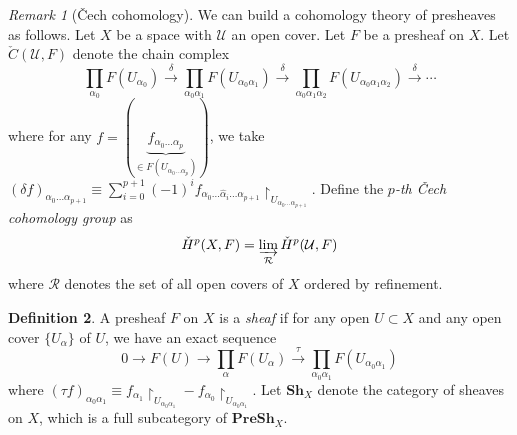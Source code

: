 \documentclass[10pt,letterpaper,cm]{nupset}
\theoremstyle{definition}
\newtheorem{definition}{Definition}[subsection]
\theoremstyle{theorem}
\theoremstyle{remark}
\newtheorem{remark}[definition]{Remark}
\newcommand{\1}{\mathbb{1}}
\newcommand{\0}{\vec 0}
\begin{document}
\begin{remark}[\v{C}ech cohomology]
We can build a cohomology theory of presheaves as follows. Let $X$ be a space with $\mathcal{U}$ an open cover. Let $F$ be a presheaf on $X$.  Let $\check{C}(\mathcal{U}, F)$ denote the chain complex
$$   \prod_{\alpha_0}F(U_{\alpha_0}) \overset{\delta}{\longrightarrow} \prod_{\alpha_0\alpha_1} F(U_{\alpha_0 \alpha_1}) \overset{\delta}{\longrightarrow} \prod_{\alpha_0\alpha_1\alpha_2}F(U_{\alpha_0\alpha_1\alpha_2}) \overset{\delta}{\longrightarrow} \cdots 
$$  where for any $f = (\underbrace{f_{\alpha_0\ldots \alpha_p}}_{\in F(U_{\alpha_0\ldots \alpha_p})})$, we take $(\delta{f})_{\alpha_0 \ldots \alpha_{p+1}} \equiv \sum_{i=0}^{p+1} ({-}1)^i f_{\alpha_0 \ldots \hat{\alpha}_i \ldots \alpha_{p+1}} \restriction_{U_{\alpha_0\ldots \alpha_{p+1}}}.$ Define the \textit{$p$-th \v{C}ech cohomology group} as $$\check{H}^p(X, F) = \varinjlim_{\mathcal{R}} \check{H}^p(\mathcal{U}, F)  $$ where $\mathcal{R}$ denotes the set of all open covers of $X$ ordered by refinement. 
\end{remark}

\begin{definition}
A presheaf $F$ on $X$ is a \textit{sheaf} if for any open $U \subset X$ and any open cover $\{U_{\alpha}\}$ of $U$, we have an exact sequence $$    0 \to F(U) \to \prod_{\alpha} F(U_{\alpha}) \overset{\tau}{\longrightarrow} \prod _{\alpha_0\alpha_1} F(U_{\alpha_0 \alpha_1})  $$ where $(\tau{f})_{\alpha_0 \alpha_1} \equiv f_{\alpha_1}\restriction_{U_{\alpha_0\alpha_1}} - f_{\alpha_0} \restriction_{U_{\alpha_0\alpha_1}} .$ Let $\mathbf{Sh}_{X}$ denote the category of sheaves on $X$, which is a full subcategory of $\mathbf{PreSh}_X$.
\end{definition}
\end{document}
